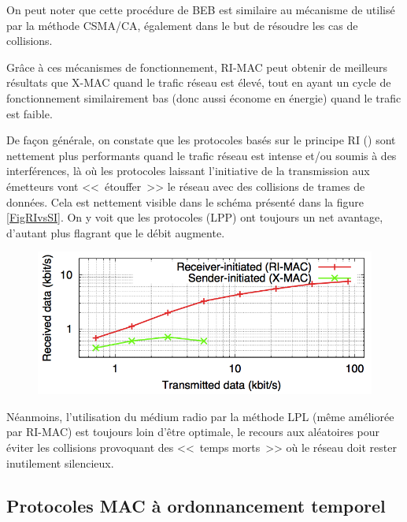 On peut noter que cette procédure de BEB est similaire au mécanisme de
 utilisé par la méthode CSMA/CA, également dans le but
de résoudre les cas de collisions.

\medskip

Grâce à ces mécanismes de fonctionnement, RI-MAC peut obtenir de meilleurs
résultats que X-MAC quand le trafic réseau est élevé, tout en ayant
un cycle de fonctionnement similairement bas (donc aussi économe en
énergie) quand le trafic est faible.

De façon générale, on constate que les protocoles basés sur le principe
RI () sont nettement plus performants quand le
trafic réseau est intense et/ou soumis à des interférences, là où les
protocoles laissant l'initiative de la transmission aux émetteurs vont
<<~étouffer~>> le réseau avec des collisions de trames de données.
Cela est nettement visible dans le schéma présenté dans la figure
\vref{FigRIvsSI}. On y voit que les protocoles
 (LPP) ont toujours un net avantage,
d'autant plus flagrant que le débit augmente.

\begin{figure}[!hbt]
\centering
\includegraphics[width=12.75cm]{images/ch3-ri-vs-si.png}
\label{FigRIvsSI}
\end{figure}

Néanmoins, l'utilisation du médium radio par la méthode LPL (même améliorée
par RI-MAC) est toujours loin d'être optimale, le recours aux 
aléatoires pour éviter les collisions provoquant des <<~temps morts~>> où
le réseau doit rester inutilement silencieux.


\subsection{Protocoles MAC à ordonnancement temporel}
\label{SubsecProtoMACTDMA}

